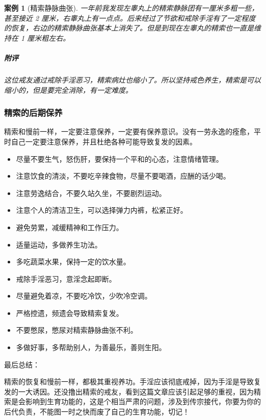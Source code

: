 \documentclass{ctexart}
\newtheorem{case}{案例}
\begin{document}
\begin{case}[精索静脉曲张]
    一年前我发现左睾丸上的精索静脉团有一厘米多粗一些，甚至接近 2 厘米，右睾丸上有一点点。后来经过了节欲和戒除手淫有了一定程度的恢复，右边的精索静脉曲张基本上消失了。但是到现在左睾丸的精索也一直是维持在 1 厘米粗左右。
    \subparagraph{附评} 这位戒友通过戒除手淫恶习，精索病灶也缩小了。所以坚持戒色养生，精索是可以缩小的，但是要完全消除，有一定难度。
\end{case}

\subsubsection{精索的后期保养}

精索和慢前一样，一定要注意保养，一定要有保养意识。没有一劳永逸的痊愈，平时自己一定要注意保养，并且杜绝各种可能导致复发的因素。

\begin{multicols}{2}
    \begin{itemize}
        \item 尽量不要生气，怒伤肝，要保持一个平和的心态，注意情绪管理。
        \item 注意饮食的清淡，不要吃辛辣食物，尽量不要喝酒，应酬的话少喝。
        \item 注意劳逸结合，不要久站久坐，不要剧烈运动。
        \item 注意个人的清洁卫生，可以选择弹力内裤，松紧正好。
        \item 避免劳累，减缓精神和工作压力。
        \item 适量运动，多做养生功法。
        \item 多吃蔬菜水果，保持一定的饮水量。
        \item 戒除手淫恶习，意淫念起即断。
        \item 尽量避免着凉，不要吃冷饮，少吹冷空调。
        \item 严格控遗，频遗会导致精索复发。
        \item 不要憋尿，憋尿对精索静脉曲张不利。
        \item 多做好事，多帮助别人，为善最乐，善则生阳。
    \end{itemize}
\end{multicols}

最后总结：

精索的恢复和慢前一样，都极其重视养功。手淫应该彻底戒掉，因为手淫是导致复发的一大诱因。还没撸出精索的戒友，看到这篇文章应该引起足够的重视，因为精索是会影响到生育功能的，这是个相当严肃的问题，涉及到传宗接代，你要为你的后代负责，不能图一时之快而废了自己的生育功能，切记！
\end{document}
